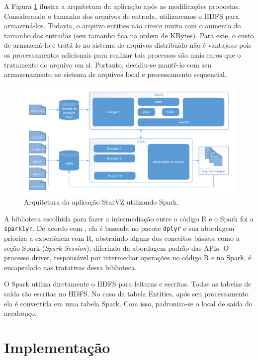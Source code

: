 A Figura \ref{fig:starvz-app-spark} ilustra a arquitetura da aplicação após as 
modificações propostas. Considerando o tamanho dos arquivos de entrada, 
utilizaremos o HDFS para armazená-los. Todavia, o arquivo entities não cresce 
muito com o aumento do tamanho das entradas (seu tamanho fica na ordem de 
KBytes). Para este, o custo de armazená-lo e tratá-lo no sistema de arquivos 
distribuído não é vantajoso pois os processamentos adicionais para realizar tais 
processos são mais caros que o tratamento do arquivo em si. Portanto, decidiu-se 
mantê-lo com seu armazenamento no sistema de arquivos local e processamento 
sequencial.

\begin{figure}[ht]
 \centerline{\includegraphics[width=1\textwidth]{./img/starvz-arch-spark.pdf}}
 \caption{Arquitetura da aplicação StarVZ utilizando Spark.}
 \label{fig:starvz-app-spark}
\end{figure}


A biblioteca escolhida para fazer a intermediação entre o código R e o Spark 
foi a \texttt{sparklyr}. De acordo com \citet{ref:sparkbook}, ela é 
baseada no pacote \texttt{dplyr} e sua abordagem prioriza a experiência com R, 
abstraindo alguns dos conceitos básicos como a seção Spark (\emph{Spark 
Session}), diferindo da abordagem padrão das APIs. O processo driver, 
responsável por intermediar operações no código R e no Spark, é encapsulado nas 
tratativas dessa biblioteca. 

O Spark utiliza diretamente o HDFS para leituras e escritas. Todas as tabelas 
de saída são escritas no HDFS. No caso da tabela Entities, após seu 
processamento ela é convertida em uma tabela Spark. Com isso, padroniza-se o 
local de saída do arcabouço.



\section{Implementação} \label{sect:implement}

